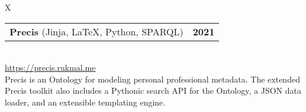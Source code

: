\documentclass[10pt]{article}
\newcommand{\tabularxwidth}{\textwidth}
\begin{document}
        \begin{tabularx}{\tabularxwidth}{X}
                {
                    \begin{tabularx}{\tabularxwidth}{@{}X r}
                        \textbf{Precis}
                            (Jinja, LaTeX, Python, SPARQL)
                        &
                        \textbf{
        2021} \\
                    \end{tabularx}
                } \\

            

            

            
                \url{https://precis.rukmal.me} \\
            

            
    Precis is an Ontology for modeling personal professional metadata. The extended Precis toolkit also includes a Pythonic search API for the Ontology, a JSON data loader, and an extensible templating engine. \\

        \end{tabularx}

        
            \vspace{.5em}
        

    
\end{document}
